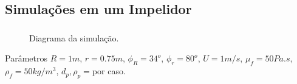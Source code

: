 \documentclass{beamer}
\begin{document}
\subsection*{Simulações em um Impelidor}
\begin{frame}
  \frametitle{\subsecname}
  
  \vspace*{-\baselineskip}\setlength\belowdisplayshortskip{0pt} %
  \begin{figure}
     {\raggedleft \tiny Diagrama da simulação.}
  \end{figure}
  \vspace*{-\baselineskip}\setlength\belowdisplayshortskip{0pt} %
  \begin{block}{Parâmetros}
    $R=1m$, $r=0.75m$, $\phi_R=34^o$, $\phi_r=80^o$, $U=1m/s$, $\mu_f=50Pa.s$, $\rho_f=50kg/m^3$, $d_p,\rho_p=$por caso.
  \end{block}
\end{frame}
\end{document}
